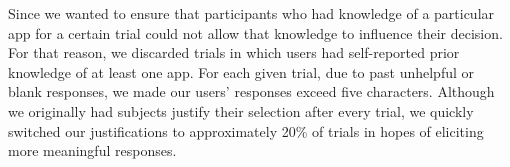 Since we wanted to ensure that participants who had knowledge of a particular app for a certain trial could not allow that knowledge to influence their decision. For that reason, we discarded trials in which users had self-reported prior knowledge of at least one app. For each given trial, due to past unhelpful or blank responses, we made our users' responses exceed five characters. Although we originally had subjects justify their selection after every trial, we quickly switched our justifications to approximately 20\% of trials in hopes of eliciting more meaningful responses.\\
